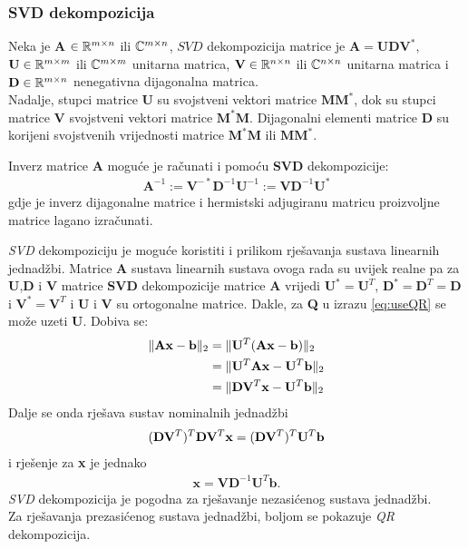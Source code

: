 \documentclass[a4paper,twoside,12pt]{memoir} %
\begin{document}
\subsubsection{SVD dekompozicija}
\begin{defn}
	Neka je \textbf{A} $\in \mathbb{R}^{m\times n}$ ili $\mathbb{C}^{m \times n}$, $SVD$ dekompozicija matrice je $\mathbf{A} = \mathbf{UDV}^*$, $\mathbf{U} \in \mathbb{R}^{m\times m}$ ili $\mathbb{C}^{m\times m}$ unitarna matrica, $\mathbf{V} \in \mathbb{R}^{n\times n}$ ili $\mathbb{C}^{n\times n}$ unitarna matrica i $\mathbf{D} \in \mathbb{R}^{m\times n}$ nenegativna dijagonalna matrica. \\
	Nadalje, stupci matrice \textbf{U} su svojstveni vektori matrice $\mathbf{MM}^*$, dok su stupci matrice \textbf{V} 
	svojstveni vektori matrice $\mathbf{M}^*\mathbf{M}$. Dijagonalni elementi matrice $\mathbf{D}$ su korijeni svojstvenih vrijednosti matrice $\mathbf{M}^*\mathbf{M}$ ili $\mathbf{MM}^*$.
\end{defn}%
Inverz matrice \textbf{A} moguće je računati i pomoću \textbf{SVD} dekompozicije:%
\begin{align}
\mathbf{A}^{-1} := \mathbf{V}^{-*}\mathbf{D}^{-1}\mathbf{U}^{-1} := \mathbf{V}\mathbf{D}^{-1}\mathbf{U}^*
\end{align}
gdje je inverz dijagonalne matrice i hermistski adjugiranu matricu proizvoljne matrice lagano izračunati.

\textit{SVD} dekompoziciju je moguće koristiti i prilikom rješavanja sustava linearnih jednadžbi.
Matrice \textbf{A} sustava linearnih sustava ovoga rada su uvijek realne pa 
za \textbf{U},\textbf{D} i \textbf{V} matrice \textbf{SVD} dekompozicije matrice \textbf{A}
vrijedi $\mathbf{U}^* = \mathbf{U}^T$, $\mathbf{D}^* = \mathbf{D}^T = \mathbf{D}$ i $\mathbf{V}^* = \mathbf{V}^T$ i \textbf{U} i \textbf{V} su ortogonalne matrice.
Dakle, za \textbf{Q} u izrazu \ref{eq:useQR} se može uzeti \textbf{U}. Dobiva se:
\begin{align}\label{eq:useSVD}
\| \mathbf{A}\mathbf{x} - \mathbf{b} \|_2	
& = \| \mathbf{U}^T(\mathbf{A}\mathbf{x} - \mathbf{b}) \|_2 \\
& = \| \mathbf{U}^T \mathbf{A}\mathbf{x} - \mathbf{U}^T \mathbf{b} \|_2	\notag \\
& = \| \mathbf{D} \mathbf{V}^T\mathbf{x} - \mathbf{U}^T \mathbf{b} \|_2 \notag
\end{align}
Dalje se onda rješava sustav nominalnih jednadžbi
\begin{align}
(\mathbf{D} \mathbf{V}^T)^T\mathbf{D} \mathbf{V}^T\mathbf{x} 
& = (\mathbf{D} \mathbf{V}^T)^T\mathbf{U}^T \mathbf{b} \notag \\
\end{align} i rješenje za \textbf{x} je jednako
\begin{align}
	\mathbf{x} = \mathbf{V}\mathbf{D}^{-1}\mathbf{U}^T \mathbf{b}.
\end{align}
\textit{SVD} dekompozicija je pogodna za rješavanje nezasićenog sustava jednadžbi.\\
Za rješavanja prezasićenog sustava jednadžbi, boljom se pokazuje \textit{QR} dekompozicija.
\label{page:boljaQRzaSustav}%
\end{document}
